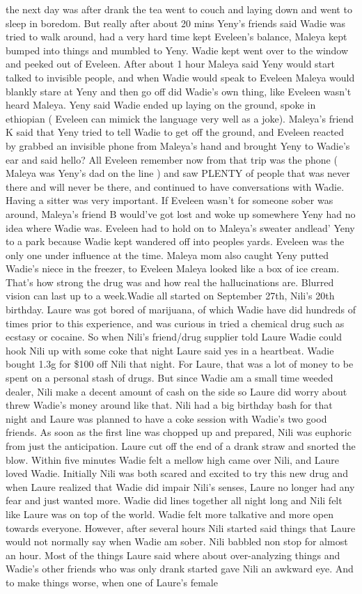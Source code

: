 \documentclass[12pt]{book}
\begin{document}
the next day was after drank the tea went to couch and laying down and went to sleep in boredom. But really after about 20 mins Yeny's friends said Wadie was tried to walk around, had a very hard time kept Eveleen's balance, Maleya kept bumped into things and mumbled to Yeny. Wadie kept went over to the window and peeked out of Eveleen. After about 1 hour Maleya said Yeny would start talked to invisible people, and when Wadie would speak to Eveleen Maleya would blankly stare at Yeny and then go off did Wadie's own thing, like Eveleen wasn't heard Maleya. Yeny said Wadie ended up laying on the ground, spoke in ethiopian ( Eveleen can mimick the language very well as a joke). Maleya's friend K said that Yeny tried to tell Wadie to get off the ground, and Eveleen reacted by grabbed an invisible phone from Maleya's hand and brought Yeny to Wadie's ear and said hello? All Eveleen remember now from that trip was the phone ( Maleya was Yeny's dad on the line ) and saw PLENTY of people that was never there and will never be there, and continued to have conversations with Wadie. Having a sitter was very important. If Eveleen wasn't for someone sober was around, Maleya's friend B would've got lost and woke up somewhere Yeny had no idea where Wadie was. Eveleen had to hold on to Maleya's sweater andlead' Yeny to a park because Wadie kept wandered off into peoples yards. Eveleen was the only one under influence at the time. Maleya mom also caught Yeny putted Wadie's niece in the freezer, to Eveleen Maleya looked like a box of ice cream. That's how strong the drug was and how real the hallucinations are. Blurred vision can last up to a week.Wadie all started on September 27th, Nili's 20th birthday. Laure was got bored of marijuana, of which Wadie have did hundreds of times prior to this experience, and was curious in tried a chemical drug such as ecstasy or cocaine. So when Nili's friend/drug supplier told Laure Wadie could hook Nili up with some coke that night Laure said yes in a heartbeat. Wadie bought 1.3g for \$100 off Nili that night. For Laure, that was a lot of money to be spent on a personal stash of drugs. But since Wadie am a small time weeded dealer, Nili make a decent amount of cash on the side so Laure did worry about threw Wadie's money around like that. Nili had a big birthday bash for that night and Laure was planned to have a coke session with Wadie's two good friends. As soon as the first line was chopped up and prepared, Nili was euphoric from just the anticipation. Laure cut off the end of a drank straw and snorted the blow. Within five minutes Wadie felt a mellow high came over Nili, and Laure loved Wadie. Initially Nili was both scared and excited to try this new drug and when Laure realized that Wadie did impair Nili's senses, Laure no longer had any fear and just wanted more. Wadie did lines together all night long and Nili felt like Laure was on top of the world. Wadie felt more talkative and more open towards everyone. However, after several hours Nili started said things that Laure would not normally say when Wadie am sober. Nili babbled non stop for almost an hour. Most of the things Laure said where about over-analyzing things and Wadie's other friends who was only drank started gave Nili an awkward eye. And to make things worse, when one of Laure's female 
\end{document}
